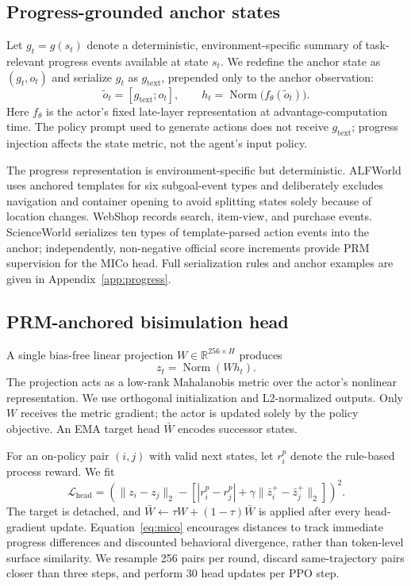 \documentclass[10pt,twocolumn,letterpaper]{article}
\begin{document}
\subsection{Progress-grounded anchor states}
Let $g_t=g(s_t)$ denote a deterministic, environment-specific summary of task-relevant progress events available at state $s_t$. We redefine the anchor state as $(g_t,o_t)$ and serialize $g_t$ as $g_{\mathrm{text}}$, prepended only to the anchor observation:
\begin{equation}
\tilde o_t=[g_{\mathrm{text}};o_t],\qquad
h_t=\operatorname{Norm}\bigl(f_\theta(\tilde o_t)\bigr).
\end{equation}
Here $f_\theta$ is the actor's fixed late-layer representation at advantage-computation time. The policy prompt used to generate actions does not receive $g_{\mathrm{text}}$; progress injection affects the state metric, not the agent's input policy.

The progress representation is environment-specific but deterministic. ALFWorld uses anchored templates for six subgoal-event types and deliberately excludes navigation and container opening to avoid splitting states solely because of location changes. WebShop records search, item-view, and purchase events. ScienceWorld serializes ten types of template-parsed action events into the anchor; independently, non-negative official score increments provide PRM supervision for the MICo head. Full serialization rules and anchor examples are given in Appendix~\ref{app:progress}.

\subsection{PRM-anchored bisimulation head}
A single bias-free linear projection $W\in\mathbb R^{256\times H}$ produces
\begin{equation}
z_t=\operatorname{Norm}(Wh_t).
\end{equation}
The projection acts as a low-rank Mahalanobis metric over the actor's nonlinear representation. We use orthogonal initialization and L2-normalized outputs. Only $W$ receives the metric gradient; the actor is updated solely by the policy objective. An EMA target head $\bar W$ encodes successor states.

For an on-policy pair $(i,j)$ with valid next states, let $r_i^p$ denote the rule-based process reward. We fit
\begin{equation}
\mathcal L_{\mathrm{head}}=
\left(\|z_i-z_j\|_2-
\left[|r_i^p-r_j^p|+\gamma\|\bar z_i^{+}-\bar z_j^{+}\|_2\right]\right)^2.
\label{eq:mico}
\end{equation}
The target is detached, and $\bar W\leftarrow\tau W+(1-\tau)\bar W$ is applied after every head-gradient update. Equation~\ref{eq:mico} encourages distances to track immediate progress differences and discounted behavioral divergence, rather than token-level surface similarity. We resample 256 pairs per round, discard same-trajectory pairs closer than three steps, and perform 30 head updates per PPO step.
\end{document}
